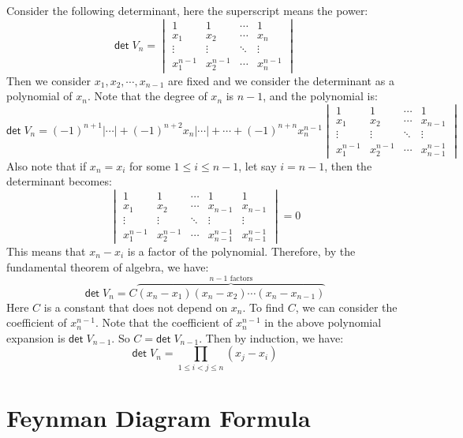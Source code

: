 \documentclass[
	11pt, %
	fleqn, %
	a4paper, %
]{LegrandOrangeBook}
\renewcommand{\det}{\mathsf{det\;}} %
\begin{document}
Consider the following determinant, here the superscript means the power:
\[
    \det V_n = \begin{vmatrix}
        1 & 1 & \cdots & 1 \\
        x_1 & x_2 & \cdots & x_n \\
        \vdots & \vdots & \ddots & \vdots \\
        x_1^{n - 1} & x_2^{n - 1} & \cdots & x_n^{n - 1}
    \end{vmatrix}
\]
Then we consider $x_1, x_2, \cdots, x_{n - 1}$ are fixed and we consider the determinant as a polynomial of $x_n$. Note that the degree of $x_n$ is $n - 1$, and the polynomial is:
\[
    \det V_n = (-1)^{n + 1} | \cdots | + (-1)^{n + 2} x_n | \cdots | + \cdots + (-1)^{n + n} x_n^{n - 1} \begin{vmatrix}
        1 & 1 & \cdots & 1 \\
        x_1 & x_2 & \cdots & x_{n - 1} \\
        \vdots & \vdots & \ddots & \vdots \\
        x_1^{n - 1} & x_2^{n - 1} & \cdots & x_{n - 1}^{n - 1}
    \end{vmatrix}
\]
Also note that if $x_n = x_i$ for some $1 \leq i \leq n - 1$, let say $i = n - 1$, then the determinant becomes:
\[
    \begin{vmatrix}
        1 & 1 & \cdots & 1 & 1 \\
        x_1 & x_2 & \cdots & x_{n - 1} & x_{n - 1} \\
        \vdots & \vdots & \ddots & \vdots & \vdots \\
        x_1^{n - 1} & x_2^{n - 1} & \cdots & x_{n - 1}^{n - 1} & x_{n - 1}^{n - 1}
    \end{vmatrix} = 0
\]
This means that $x_n - x_i$ is a factor of the polynomial. Therefore, by the fundamental theorem of algebra, we have:
\[
    \det V_n = C \overbrace{(x_n - x_1)(x_n - x_2) \cdots (x_n - x_{n - 1})}^{n - 1 \text{ factors}}
\]
Here $C$ is a constant that does not depend on $x_n$. To find $C$, we can consider the coefficient of $x_n^{n - 1}$. Note that the coefficient of $x_n^{n - 1}$ in the above polynomial expansion is $\det V_{n - 1}$. So $C = \det V_{n - 1}$. Then by induction, we have:
\[
    \det V_n = \prod_{1 \leq i < j \leq n} (x_j - x_i)
\]

\newpage

\section{Feynman Diagram Formula}
\end{document}
